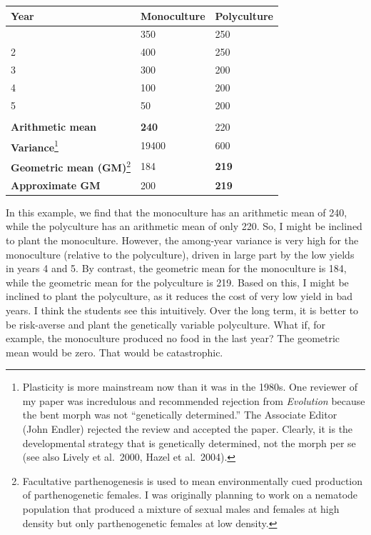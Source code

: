 \documentclass[
  letterpaper,
]{book}
\begin{document}
\begin{longtable}[]{@{}lll@{}}
\toprule\noalign{}
Year & Monoculture & Polyculture \\
\midrule\noalign{}
\endhead
\bottomrule\noalign{}
\endlastfoot
1 & 350 & 250 \\
2 & 400 & 250 \\
3 & 300 & 200 \\
4 & 100 & 200 \\
5 & 50 & 200 \\
& & \\
\textbf{Arithmetic mean} & \textbf{240} & 220 \\
\textbf{Variance}\footnote{Plasticity is more mainstream now than it was
  in the 1980s. One reviewer of my paper was incredulous and recommended
  rejection from \emph{Evolution} because the bent morph was not
  ``genetically determined.'' The Associate Editor (John Endler)
  rejected the review and accepted the paper. Clearly, it is the
  developmental strategy that is genetically determined, not the morph
  per se (see also Lively et al.~2000, Hazel et al.~2004).} & 19400 &
600 \\
\textbf{Geometric mean (GM)}\footnote{Facultative parthenogenesis is
  used to mean environmentally cued production of parthenogenetic
  females. I was originally planning to work on a nematode population
  that produced a mixture of sexual males and females at high density
  but only parthenogenetic females at low density.} & 184 &
\textbf{219} \\
\textbf{Approximate GM} & 200 & \textbf{219} \\
\end{longtable}

In this example, we find that the monoculture has an arithmetic mean of
240, while the polyculture has an arithmetic mean of only 220. So, I
might be inclined to plant the monoculture. However, the among-year
variance is very high for the monoculture (relative to the polyculture),
driven in large part by the low yields in years 4 and 5. By contrast,
the geometric mean for the monoculture is 184, while the geometric mean
for the polyculture is 219. Based on this, I might be inclined to plant
the polyculture, as it reduces the cost of very low yield in bad years.
I think the students see this intuitively. Over the long term, it is
better to be risk-averse and plant the genetically variable polyculture.
What if, for example, the monoculture produced no food in the last year?
The geometric mean would be zero. That would be catastrophic.
\end{document}
